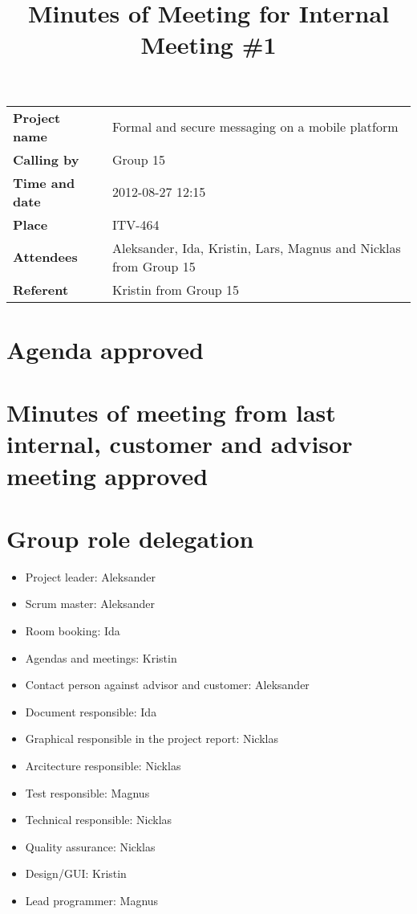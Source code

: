 \documentclass[a4paper,12pt]{article}
\begin{document}
\title{Minutes of Meeting for Internal Meeting \#1}
\maketitle
\begin{tabular}{>{\bfseries}l l}	
Project name&Formal and secure messaging on a mobile platform\\
Calling by&Group 15\\
Time and date&2012-08-27 12:15\\
Place&ITV-464\\
Attendees&Aleksander, Ida, Kristin, Lars, Magnus and Nicklas from Group 15\\
Referent&Kristin from Group 15\\
\end{tabular}

\section{Agenda approved}
\section{Minutes of meeting from last internal, customer and advisor meeting approved}
\section{Group role delegation}
\begin{itemize}
\item
Project leader: Aleksander
\item
Scrum master: Aleksander
\item
Room booking: Ida
\item
Agendas and meetings: Kristin
\item
Contact person against advisor and customer: Aleksander
\item
Document responsible: Ida
\item
Graphical responsible in the project report: Nicklas
\item
Arcitecture responsible: Nicklas
\item
Test responsible: Magnus
\item
Technical responsible: Nicklas
\item
Quality assurance: Nicklas
\item
Design/GUI: Kristin
\item
Lead programmer: Magnus
\end{itemize}
\end{document}

